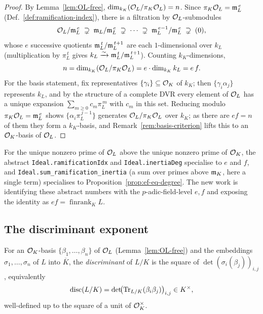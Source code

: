 \begin{proof}
By Lemma~\ref{lem:OL-free}, $\operatorname{dim}_{k_K}(\mathcal{O}_L/\pi_K\mathcal{O}_L)=n$. Since
$\pi_K\mathcal{O}_L=\mathfrak{m}_L^{\,e}$ (Def.~\ref{def:ramification-index}), there is a filtration
by $\mathcal{O}_L$-submodules
\[
  \mathcal{O}_L/\mathfrak{m}_L^{\,e}\;\supsetneq\;\mathfrak{m}_L/\mathfrak{m}_L^{\,e}\;\supsetneq\;\cdots
  \;\supsetneq\;\mathfrak{m}_L^{\,e-1}/\mathfrak{m}_L^{\,e}\;\supsetneq\;(0),
\]
whose $e$ successive quotients $\mathfrak{m}_L^{\,t}/\mathfrak{m}_L^{\,t+1}$ are each $1$-dimensional
over $k_L$ (multiplication by $\pi_L^{\,t}$ gives $k_L\xrightarrow{\sim}
\mathfrak{m}_L^{\,t}/\mathfrak{m}_L^{\,t+1}$). Counting $k_K$-dimensions,
\[
  n=\operatorname{dim}_{k_K}(\mathcal{O}_L/\pi_K\mathcal{O}_L)=e\cdot\operatorname{dim}_{k_K}k_L=e\,f .
\]
For the basis statement, fix representatives $\{\gamma_i\}\subseteq\mathcal{O}_K$ of
$k_K$; then $\{\gamma_i\alpha_j\}$ represents $k_L$, and by the structure of a
complete DVR every element of $\mathcal{O}_L$ has a unique expansion
$\sum_{m\ge 0}c_m\pi_L^{\,m}$ with $c_m$ in this set. Reducing modulo
$\pi_K\mathcal{O}_L=\mathfrak{m}_L^{\,e}$ shows $\{\alpha_i\pi_L^{\,j-1}\}$ generates $\mathcal{O}_L/\pi_K\mathcal{O}_L$
over $k_K$; as there are $ef=n$ of them they form a $k_K$-basis, and
Remark~\ref{rem:basis-criterion} lifts this to an $\mathcal{O}_K$-basis of $\mathcal{O}_L$.
\end{proof}

\begin{remark}
\mathlibok
For the unique nonzero prime of $\mathcal{O}_L$ above the unique nonzero prime of $\mathcal{O}_K$,
the abstract \texttt{Ideal.ramificationIdx} and \texttt{Ideal.inertiaDeg}
specialise to $e$ and $f$, and \texttt{Ideal.sum\_ramification\_inertia} (a sum
over primes above $\mathfrak{m}_K$, here a single term) specialises to
Proposition~\ref{prop:ef-eq-degree}. The new work is identifying these abstract
numbers with the $p$-adic-field-level $e,f$ and exposing the identity as
$ef=\operatorname{finrank}_K L$.
\end{remark}

\subsection{The discriminant exponent}
\label{subsec:disc}

\begin{definition}[Discriminant of $L/K$]
\label{def:discriminant}
\mathlibok
For an $\mathcal{O}_K$-basis $\{\beta_1,\dots,\beta_n\}$ of $\mathcal{O}_L$
(Lemma~\ref{lem:OL-free}) and the embeddings $\sigma_1,\dots,\sigma_n$ of $L$
into $\overline K$, the \emph{discriminant} of $L/K$ is the square of
$\det(\sigma_i(\beta_j))_{i,j}$, equivalently
\[
  \operatorname{disc}(L/K)=\det\!\bigl(\operatorname{Tr}_{L/K}(\beta_i\beta_j)\bigr)_{i,j}\in K^\times ,
\]
well-defined up to the square of a unit of $\mathcal{O}_K^\times$.
\end{definition}

